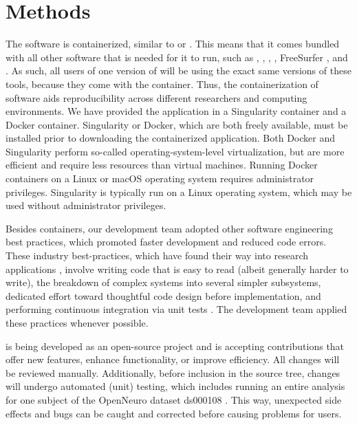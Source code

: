 \section{Methods}

The  software is containerized, similar to 
or . This means that it comes bundled with all other software
that is needed for it to run, such as 
\parencite{10.1038/s41592-018-0235-4}, 
\parencite{10.1371/journal.pone.0184661}, 
\parencite{10.1016/j.neuroimage.2011.09.015}, 
\parencite{10.1016/j.neuroimage.2010.09.025}, FreeSurfer
\parencite{10.1073/pnas.200033797}, and 
\parencite{10.1006/cbmr.1996.0014,cox_afni_1997}.
As such, all users of one version of  will be using the
exact same versions of these tools, because they come with the container.
Thus, the containerization of  software aids reproducibility
across different researchers and computing environments. We have provided
the  application in a Singularity container and a Docker
container. Singularity or Docker, which are both freely available, must be
installed prior to downloading the containerized 
application. Both Docker and Singularity perform so-called
operating-system-level virtualization, but are more efficient and require
less resources than virtual machines. Running Docker containers on a Linux
or macOS operating system requires administrator privileges. Singularity is
typically run on a Linux operating system, which may be used without
administrator privileges.

Besides containers, our  development team adopted other
software engineering best practices, which promoted faster development and
reduced code errors. These industry best-practices, which have found their
way into research applications \parencite{das_programming_2018}, involve
writing code that is easy to read (albeit generally harder to write), the
breakdown of complex systems into several simpler subsystems, dedicated
effort toward thoughtful code design before implementation, and performing
continuous integration via unit tests \parencite{beckkent2000epe:}. The
 development team applied these practices whenever possible.

 is being developed as an open-source project and is
accepting contributions that offer new features, enhance functionality, or
improve efficiency. All changes will be reviewed manually. Additionally,
before inclusion in the source tree, changes will undergo automated (unit)
testing, which includes running an entire analysis for one subject of the
OpenNeuro dataset ds000108 \parencite{10.1016/j.neuron.2008.09.006}. This way,
unexpected side effects and bugs can be caught and corrected before causing
problems for users.

